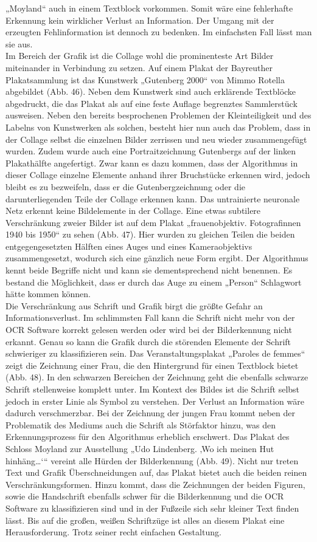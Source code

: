 \documentclass[a4paper,12pt,ngerman]{article}
\begin{document}
„Moyland“ auch in einem Textblock vorkommen. Somit wäre eine fehlerhafte Erkennung kein wirklicher Verlust an Information. Der Umgang mit der erzeugten Fehlinformation ist dennoch zu bedenken. Im einfachsten Fall lässt man sie aus. \\
Im Bereich der Grafik ist die Collage wohl die prominenteste Art Bilder miteinander in Verbindung zu setzen. Auf einem Plakat der Bayreuther Plakatsammlung ist das Kunstwerk „Gutenberg 2000“ von Mimmo Rotella abgebildet (Abb. 46). Neben dem Kunstwerk sind auch erklärende Textblöcke abgedruckt, die das Plakat als auf eine feste Auflage begrenztes Sammlerstück ausweisen. Neben den bereits besprochenen Problemen der Kleinteiligkeit und des Labelns von Kunstwerken als solchen, besteht hier nun auch das Problem, dass in der Collage selbst die einzelnen Bilder zerrissen und neu wieder zusammengefügt wurden. Zudem wurde auch eine Portraitzeichnung Gutenbergs auf der linken Plakathälfte angefertigt. Zwar kann es dazu kommen, dass der Algorithmus in dieser Collage einzelne Elemente anhand ihrer Bruchstücke erkennen wird, jedoch bleibt es zu bezweifeln, dass er die Gutenbergzeichnung oder die darunterliegenden Teile der Collage erkennen kann. Das untrainierte neuronale Netz erkennt keine Bildelemente in der Collage. Eine etwas subtilere Verschränkung zweier Bilder ist auf dem Plakat „frauenobjektiv. Fotografinnen 1940 bis 1950“ zu sehen (Abb. 47). Hier wurden zu gleichen Teilen die beiden entgegengesetzten Hälften eines Auges und eines Kameraobjektivs zusammengesetzt, wodurch sich eine gänzlich neue Form ergibt. Der Algorithmus kennt beide Begriffe nicht und kann sie dementsprechend nicht benennen. Es bestand die Möglichkeit, dass er durch das Auge zu einem „Person“ Schlagwort hätte kommen können. \\
Die Verschränkung aus Schrift und Grafik birgt die größte Gefahr an Informationsverlust. Im schlimmsten Fall kann die Schrift nicht mehr von der OCR Software korrekt gelesen werden oder wird bei der Bilderkennung nicht erkannt. Genau so kann die Grafik durch die störenden Elemente der Schrift schwieriger zu klassifizieren sein. Das Veranstaltungsplakat „Paroles de femmes“ zeigt die Zeichnung einer Frau, die den Hintergrund für einen Textblock bietet (Abb. 48). In den schwarzen Bereichen der Zeichnung geht die ebenfalls schwarze Schrift stellenweise komplett unter. Im Kontext des Bildes ist die Schrift selbst jedoch in erster Linie als Symbol zu verstehen. Der Verlust an Information wäre dadurch verschmerzbar. Bei der Zeichnung der jungen Frau kommt neben der Problematik des Mediums auch die Schrift als Störfaktor hinzu, was den Erkennungsprozess für den Algorithmus erheblich erschwert. Das Plakat des Schloss Moyland zur Ausstellung „Udo Lindenberg. ‚Wo ich meinen Hut hinhäng…‘“ vereint alle Hürden der Bilderkennung (Abb. 49). Nicht nur treten Text und Grafik Überschneidungen auf, das Plakat bietet auch die beiden reinen Verschränkungsformen. Hinzu kommt, dass die Zeichnungen der beiden Figuren, sowie die Handschrift ebenfalls schwer für die Bilderkennung und die OCR Software zu klassifizieren sind und in der Fußzeile sich sehr kleiner Text finden lässt. Bis auf die großen, weißen Schriftzüge ist alles an diesem Plakat eine Herausforderung. Trotz seiner recht einfachen Gestaltung.
\end{document}
